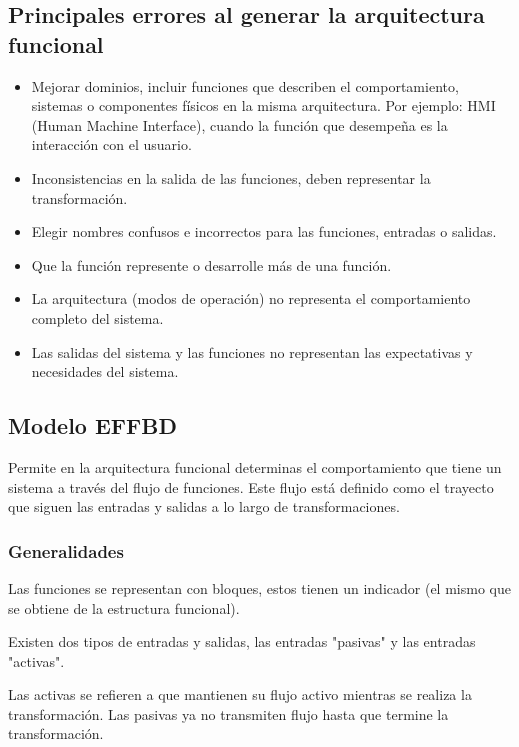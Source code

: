\subsection{Principales errores al generar la arquitectura funcional}
\begin{itemize}
    \item Mejorar dominios, incluir funciones que describen el comportamiento, sistemas o componentes físicos en la misma arquitectura. Por ejemplo: HMI (Human Machine Interface), cuando la función que desempeña es la interacción con el usuario.
    \item Inconsistencias en la salida de las funciones, deben representar la transformación.
    \item Elegir nombres confusos e incorrectos para las funciones, entradas o salidas.
    \item Que la función represente o desarrolle más de una función.
    \item La arquitectura (modos de operación) no representa el comportamiento completo del sistema.
    \item Las salidas del sistema y las funciones no representan las expectativas y necesidades del sistema.
\end{itemize}

\subsection{Modelo EFFBD}
Permite en la arquitectura funcional determinas el comportamiento que tiene un sistema a través del flujo de funciones. Este flujo está definido como el trayecto que siguen las entradas y salidas a lo largo de transformaciones.

\subsubsection{Generalidades}
Las funciones se representan con bloques, estos tienen un indicador (el mismo que se obtiene de la estructura funcional).

Existen dos tipos de entradas y salidas, las entradas "pasivas" y las entradas "activas".

Las activas se refieren a que mantienen su flujo activo mientras se realiza la transformación. Las pasivas ya no transmiten flujo hasta que termine la transformación. 